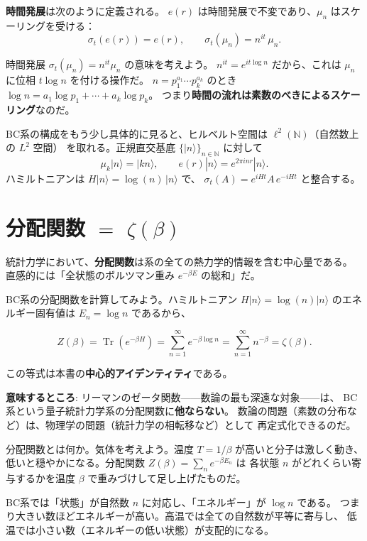 \documentclass[11pt,a4paper]{article}
\theoremstyle{definition}
\newcommand{\N}{\mathbb{N}}
\newcommand{\Tr}{\operatorname{Tr}}
\begin{document}
\noindent\textbf{時間発展}は次のように定義される。
$e(r)$ は時間発展で不変であり、$\mu_n$ はスケーリングを受ける：
\[
  \sigma_t(e(r)) = e(r), \qquad
  \sigma_t(\mu_n) = n^{it}\, \mu_n.
\]

\begin{hsbox}
時間発展 $\sigma_t(\mu_n) = n^{it}\mu_n$ の意味を考えよう。
$n^{it} = e^{it\log n}$ だから、これは $\mu_n$ に位相 $t\log n$ を付ける操作だ。
$n = p_1^{a_1}\cdots p_k^{a_k}$ のとき $\log n = a_1 \log p_1 + \cdots + a_k \log p_k$。
つまり\textbf{時間の流れは素数のべきによるスケーリング}なのだ。
\end{hsbox}

BC系の構成をもう少し具体的に見ると、ヒルベルト空間は $\ell^2(\N)$（自然数上の $L^2$ 空間）
を取れる。正規直交基底 $\{|n\rangle\}_{n\in\N}$ に対して
\[
  \mu_k |n\rangle = |kn\rangle, \qquad
  e(r) |n\rangle = e^{2\pi i n r} |n\rangle.
\]
ハミルトニアンは $H|n\rangle = \log(n)\,|n\rangle$ で、
$\sigma_t(A) = e^{iHt}A\,e^{-iHt}$ と整合する。

\section{分配関数 $=$ $\zeta(\beta)$}
\label{sec:2.3}

統計力学において、\textbf{分配関数}は系の全ての熱力学的情報を含む中心量である。
直感的には「全状態のボルツマン重み $e^{-\beta E}$ の総和」だ。

BC系の分配関数を計算してみよう。ハミルトニアン $H|n\rangle = \log(n)|n\rangle$
のエネルギー固有値は $E_n = \log n$ であるから、

\begin{keybox}[BC系の分配関数 $=$ ゼータ関数]
\[
  Z(\beta) = \Tr(e^{-\beta H})
           = \sum_{n=1}^{\infty} e^{-\beta \log n}
           = \sum_{n=1}^{\infty} n^{-\beta}
           = \zeta(\beta).
\]
\end{keybox}

\noindent この等式は本書の\textbf{中心的アイデンティティ}である。

\textbf{意味するところ}: リーマンのゼータ関数——数論の最も深遠な対象——は、
BC系という量子統計力学系の分配関数に\textbf{他ならない}。
数論の問題（素数の分布など）は、物理学の問題（統計力学の相転移など）として
再定式化できるのだ。

\begin{hsbox}
分配関数とは何か。気体を考えよう。温度 $T = 1/\beta$ が高いと分子は激しく動き、
低いと穏やかになる。分配関数 $Z(\beta) = \sum_n e^{-\beta E_n}$ は
各状態 $n$ がどれくらい寄与するかを温度 $\beta$ で重みづけして足し上げたものだ。

BC系では「状態」が自然数 $n$ に対応し、「エネルギー」が $\log n$ である。
つまり大きい数ほどエネルギーが高い。高温では全ての自然数が平等に寄与し、
低温では小さい数（エネルギーの低い状態）が支配的になる。
\end{hsbox}
\end{document}
